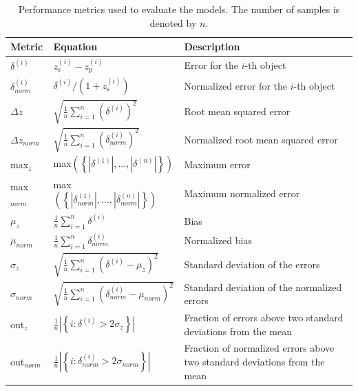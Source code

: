 \documentclass[useAMS,usenatbib,fleqn]{mn2e}
\begin{document}
 \begin{table}
 \caption{Performance metrics used to evaluate the models. The number of samples is denoted by $n$.}
\begin{center}
  \begin{tabular}{| l | l | l |}
     	Metric				&	Equation	& Description\\	\hline
	$\delta^{\left(i\right)}$		&	$z_\textrm{s}^{\left(i\right)}-z_\textrm{p}^{\left(i\right)}	$		&Error for the $i$-th object\\

	$\delta^{\left(i\right)}_{norm}$		&	$\delta^{\left(i\right)}/\left(1+z_\textrm{s}^{\left(i\right)}\right)$	&Normalized error for the $i$-th object		\\

	$\Delta z$		&	$\sqrt{\frac{1}{n}\sum_{i=1}^{n}\left(\delta^{\left(i\right)}\right)^{2}}$	&Root mean squared error		\\

	$\Delta z_{norm}$		&	$\sqrt{\frac{1}{n}\sum_{i=1}^{n}\left(\delta_{norm}^{\left(i\right)}\right)^{2}}$	&Normalized root mean squared error		\\

	max$_{z}$	& max$\left(\left\{\left |\delta^{\left(1\right)}\right |,\hdots,\left |\delta^{\left(n\right)}\right |\right\}\right)$& Maximum error \\
	
	max$_{norm}$	& max$\left(\left\{\left |\delta_{norm}^{\left(1\right)}\right |,\hdots,\left |\delta_{norm}^{\left(n\right)}\right |\right\}\right)$& Maximum normalized error \\
	
	$\mu_{z}$		&	$\frac{1}{n}\sum_{i=1}^{n}\delta^{\left(i\right)}$	&Bias		\\

	$\mu_{norm}$		&	$\frac{1}{n}\sum_{i=1}^{n}\delta_{norm}^{\left(i\right)}$	&Normalized bias		\\

	$\sigma_{z}$		&	$\sqrt{\frac{1}{n}\sum_{i=1}^{n}\left(\delta^{\left(i\right)}-\mu_{z}\right)^{2}}$	&Standard deviation of the errors		\\

	$\sigma_{norm}$		&	$\sqrt{\frac{1}{n}\sum_{i=1}^{n}\left(\delta_{norm}^{\left(i\right)}-\mu_{norm}\right)^{2}}$	&Standard deviation of the normalized errors \\
	
	out$_{z}$		&	$\frac{1}{n}\left | \left\{i: \delta^{\left(i\right)}>2\sigma_{z}\right\}\right |$	&Fraction of errors above two standard deviations from the mean \\
	out$_{norm}$		&	$\frac{1}{n}\left | \left\{i: \delta_{norm}^{\left(i\right)}>2\sigma_{norm}\right\}\right |$	&Fraction of normalized errors above two standard deviations from the mean\\ \hline
	
  \end{tabular}
\end{center}
\label{table-metrics}
\end{table}
\end{document}
